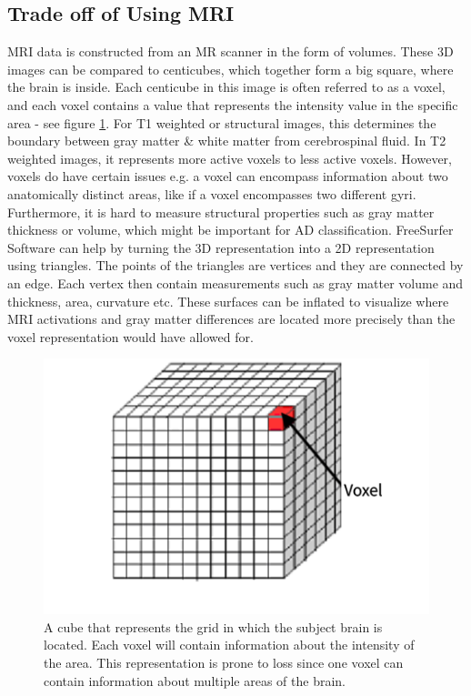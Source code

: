 \documentclass[11pt, fleqn, titlepage]{article}
\newcommand{\1}[1]{\mathds{1}\left[#1\right]}
\begin{document}
\subsection{Trade off of Using MRI}

MRI data is constructed from an MR scanner in the form of volumes. These 3D images can be compared to centicubes, which together form a big square, where the brain is inside. Each centicube in this image is often referred to as a voxel, and each voxel contains a value that represents the intensity value in the specific area - see figure \ref{fig:voxel}. For T1 weighted or structural images, this determines the boundary between gray matter \& white matter from cerebrospinal fluid. In T2 weighted images, it represents more active voxels to  less active voxels. However, voxels do have certain issues e.g. a voxel can encompass information about two anatomically distinct areas, like if a voxel encompasses two different gyri. Furthermore, it is hard to measure structural properties such as gray matter thickness or volume, which might be important for AD classification. FreeSurfer Software can help by turning the 3D representation into a 2D representation using triangles. The points of the triangles are vertices and they are connected by an edge. Each vertex then contain measurements such as gray matter volume and thickness, area, curvature etc. These surfaces can be inflated to visualize where MRI activations and gray matter differences are located more precisely than the voxel representation would have allowed for. 

\begin{figure}[H]
	\centering
	\includegraphics[width=0.42\linewidth]{imgs/voxel}
	\caption{A cube that represents the grid in which the subject brain is located. Each voxel will contain information about the intensity of the area. This representation is prone to loss since one voxel can contain information about multiple areas of the brain.}
	\label{fig:voxel}
\end{figure}
\end{document}
